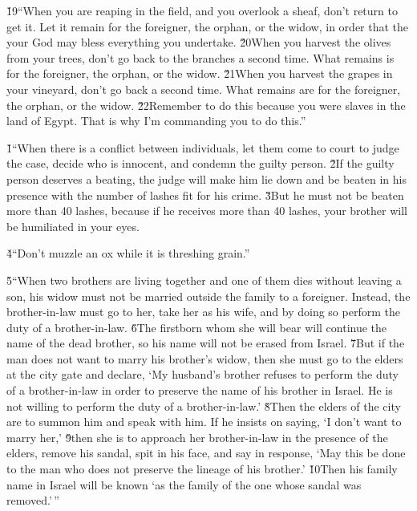\v{19}``When you are reaping in the field, and you overlook a sheaf, don't return to get it. Let it remain for the foreigner, the orphan, or the widow, in order that the  your God may bless everything you undertake. \v{20}When you harvest the olives from your trees, don't go back to the branches a second time. What remains is for the foreigner, the orphan, or the widow. \v{21}When you harvest the grapes in your vineyard, don't go back a second time. What remains are for the foreigner, the orphan, or the widow. \v{22}Remember to do this because you were slaves in the land of Egypt. That is why I'm commanding you to do this.''

\v{1}``When there is a conflict between individuals, let them come to court to judge the case, decide who is innocent, and condemn the guilty person. \v{2}If the guilty person deserves a beating, the judge will make him lie down and be beaten in his presence with the number of lashes fit for his crime. \v{3}But he must not be beaten more than 40 lashes, because if he receives more than 40 lashes, your brother will be humiliated in your eyes.

\v{4}``Don't muzzle an ox while it is threshing grain.''

\v{5}``When two brothers are living together and one of them dies without leaving a son, his widow must not be married outside the family to a foreigner. Instead, the brother-in-law must go to her, take her as his wife, and by doing so perform the duty of a brother-in-law. \v{6}The firstborn whom she will bear will continue the name of the dead brother, so his name will not be erased from Israel. \v{7}But if the man does not want to marry his brother's widow, then she must go to the elders at the city gate and declare, `My husband's brother refuses to perform the duty of a brother-in-law in order to preserve the name of his brother in Israel. He is not willing to perform the duty of a brother-in-law.' \v{8}Then the elders of the city are to summon him and speak with him. If he insists on saying, `I don't want to marry her,' \v{9}then she is to approach her brother-in-law in the presence of the elders, remove his sandal, spit in his face, and say in response, `May this be done to the man who does not preserve the lineage of his brother.' \v{10}Then his family name in Israel will be known `as the family of the one whose sandal was removed.'\,''

